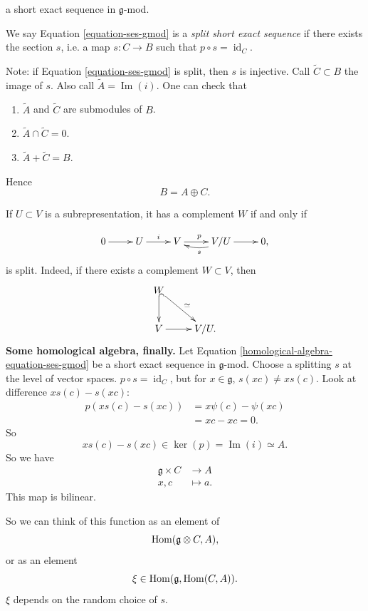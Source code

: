 \noindent
a short exact sequence in
$\mathfrak{g}$-mod.

\begin{definition}
\label{definition-split}
We say Equation \ref{equation-ses-gmod}
is a {\it split short exact sequence} 
if there exists the section $s$,
i.e. a map $s:C \to B$ such that $p \circ s
= \operatorname{id}_C$.
\end{definition}

\noindent
Note: if Equation \ref{equation-ses-gmod}
is split, then $s$ is injective.
Call $\widetilde{C} \subset B$
the image of $s$.
Also call $\tilde{A} =
\operatorname{Im}(i)$.
One can check that
\begin{enumerate}
\item $\widetilde{A}$ and
$\widetilde{C}$ are submodules of $B$.

\item $\tilde{A} \cap \widetilde{C}=0$.

\item $\widetilde{A}+\widetilde{C}=B$.
\end{enumerate}

\noindent
Hence
$$
B=A \oplus C.
$$

\medskip\noindent
If $U \subset V$ is a subrepresentation,
it has a complement $W$ if and only if

$$
\xymatrix{
0\ar[r]
&U\ar[r]^i
&V\ar[r]^p
&V/U\ar[r]\ar@/^.5pc/[l]^s
&0,
}
$$
is split. Indeed, if there exists
a complement $W \subset V$, then
$$
\xymatrix{
W \ar@{^{(}->}[d]\ar[dr]^{\simeq}\\
V \ar[r] & V/U.
}
$$
\medskip\noindent
{\bf Some homological algebra, finally.} 
Let Equation
\ref{homological-algebra-equation-ses-gmod}
be a short exact sequence in
$\mathfrak{g}$-mod. Choose a splitting $s$
at the level of vector spaces.
$p \circ s = \operatorname{id}_C$,
but for $x \in \mathfrak{g}$,
$s(xc) \neq  xs(c)$.
Look at difference $x s(c) - s(xc)$:
$$
\begin{aligned}
p(xs(c)-s(xc)) &= x \psi(c)-\psi(xc)\\
&=xc-xc = 0.
\end{aligned}
$$
So $$
xs(c) - s(xc) \in \ker(p)
= \operatorname{Im}(i) \simeq A.
$$
So we have
$$
\begin{aligned}
\mathfrak{g}\times C &\longrightarrow A \\
x,c &\longmapsto a.
\end{aligned}
$$
This map is bilinear.

So we can think of this function as an
element of
$$
\mathop{\mathrm{Hom}}\nolimits(\mathfrak{g} \otimes C,A),
$$
or as an element
$$
\xi \in
\mathop{\mathrm{Hom}}\nolimits(\mathfrak{g},\mathop{\mathrm{Hom}}\nolimits(C,A)).
$$
$\xi$ depends on the random choice of $s$.

